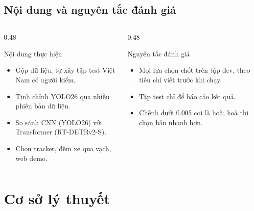 \documentclass[aspectratio=\mlwAspectRatio, \mlwBaseSize, t]{beamer}
\begin{document}
\subsection{Nội dung và nguyên tắc đánh giá}
\begin{frame}{\stitle}
  \begin{columns}[T]
    \begin{column}{0.48\textwidth}
      \begin{block}{Nội dung thực hiện}
        \begin{itemize}
          \item Gộp dữ liệu, tự xây tập test Việt Nam có người kiểm.
          \item Tinh chỉnh YOLO26 qua nhiều phiên bản dữ liệu.
          \item So sánh CNN (YOLO26) với Transformer (RT-DETRv2-S).
          \item Chọn tracker, đếm xe qua vạch, web demo.
        \end{itemize}
      \end{block}
    \end{column}
    \begin{column}{0.48\textwidth}
      \begin{block}{Nguyên tắc đánh giá}
        \begin{itemize}
          \item Mọi lựa chọn chốt trên tập \alert{dev}, theo tiêu chí viết trước khi chạy.
          \item Tập \alert{test} chỉ để báo cáo kết quả.
          \item Chênh dưới 0.005 coi là hoà; hoà thì chọn bản nhanh hơn.
        \end{itemize}
      \end{block}
    \end{column}
  \end{columns}
\end{frame}

\section{Cơ sở lý thuyết}
\end{document}
